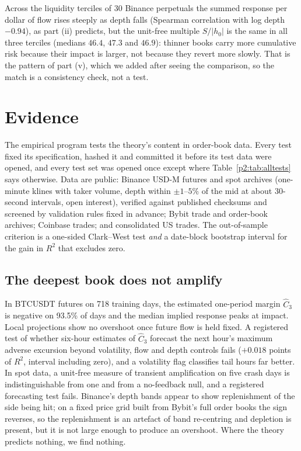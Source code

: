     Across the liquidity terciles of 30 Binance perpetuals the summed response per dollar of flow rises steeply as depth falls (Spearman correlation with log depth $-0.94$), as part (ii) predicts, but the unit-free multiple $S/|h_0|$ is the same in all three terciles (medians $46.4$, $47.3$ and $46.9$): thinner books carry more cumulative risk because their impact is larger, not because they revert more slowly. That is the pattern of part (v), which we added after seeing the comparison, so the match is a consistency check, not a test.

    \section{Evidence}\label{p2:sec:evidence}

    The empirical program tests the theory's content in order-book data. Every test fixed its specification, hashed it and committed it before its test data were opened, and every test set was opened once except where Table~\ref{p2:tab:alltests} says otherwise. Data are public: Binance USD-M futures and spot archives (one-minute klines with taker volume, depth within $\pm1$--$5\%$ of the mid at about 30-second intervals, open interest), verified against published checksums and screened by validation rules fixed in advance; Bybit trade and order-book archives; Coinbase trades; and consolidated US trades. The out-of-sample criterion is a one-sided Clark--West test \emph{and} a date-block bootstrap interval for the gain in $R^2$ that excludes zero.

    \subsection{The deepest book does not amplify}

    In BTCUSDT futures on 718 training days, the estimated one-period margin $\hat C_3$ is negative on 93.5\% of days and the median implied response peaks at impact. Local projections show no overshoot once future flow is held fixed. A registered test of whether six-hour estimates of $\hat C_3$ forecast the next hour's maximum adverse excursion beyond volatility, flow and depth controls fails ($+0.018$ points of $R^2$, interval including zero), and a volatility flag classifies tail hours far better. In spot data, a unit-free measure of transient amplification on five crash days is indistinguishable from one and from a no-feedback null, and a registered forecasting test fails. Binance's depth bands appear to show replenishment of the side being hit; on a fixed price grid built from Bybit's full order books the sign reverses, so the replenishment is an artefact of band re-centring and depletion is present, but it is not large enough to produce an overshoot. Where the theory predicts nothing, we find nothing.


